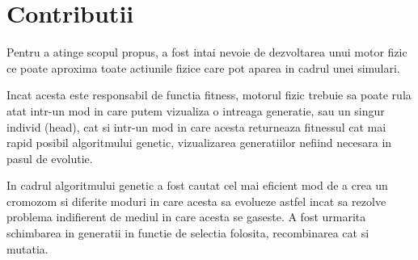 \chapter*{Contributii} 

Pentru a atinge scopul propus, a fost intai nevoie de dezvoltarea unui motor fizic ce poate aproxima toate actiunile fizice care pot aparea in cadrul unei simulari. 

Incat acesta este responsabil de functia fitness, motorul fizic trebuie sa poate rula atat intr-un mod in care putem vizualiza o intreaga generatie, sau un singur individ (head), cat si intr-un mod in care acesta returneaza fitnessul cat mai rapid posibil algoritmului genetic, vizualizarea generatiilor nefiind necesara in pasul de evolutie. 

In cadrul algoritmului genetic a fost cautat cel mai eficient mod de a crea un cromozom si diferite moduri in care acesta sa evolueze astfel incat sa rezolve problema indifierent de mediul in care acesta se gaseste. A fost urmarita schimbarea in generatii in functie de selectia folosita, recombinarea cat si mutatia.